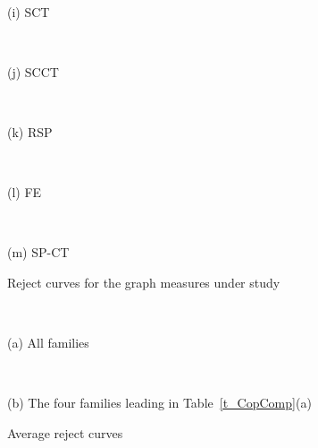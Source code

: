 \documentclass{article}
\begin{document}
\begin{figure}[H]
	\begin{minipage}{.196\textwidth} %
		\\\centerline{(i) SCT}
	\end{minipage}
	\begin{minipage}{.196\textwidth} %
		\\\centerline{(j) SCCT}
	\end{minipage}
	\begin{minipage}{.196\textwidth} %
		\\\centerline{(k) RSP}
	\end{minipage}
	\begin{minipage}{.196\textwidth} %
		\\\centerline{(l) FE}
	\end{minipage}
	\begin{minipage}{.196\textwidth} %
		\\\centerline{(m) SP-CT}
	\end{minipage}

    \caption{\label{f_Reject}Reject curves for the graph measures under study}
\end{figure}

\begin{figure}[H] %
	\begin{minipage}{.56\textwidth}
		\\\centerline{(a) All families}
	\end{minipage}%
	\begin{minipage}{.42\textwidth}
		\\\centerline{(b) The four families leading in Table~\ref{t_CopComp}(a)}
	\end{minipage}
\caption{\label{f_Rcur}Average reject curves}
\end{figure}


\newpage
\end{document}
